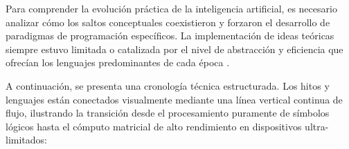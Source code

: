 \documentclass[12pt, a4paper]{article}
\begin{document}
Para comprender la evolución práctica de la inteligencia artificial, es necesario analizar cómo los saltos conceptuales coexistieron y forzaron el desarrollo de paradigmas de programación específicos. La implementación de ideas teóricas siempre estuvo limitada o catalizada por el nivel de abstracción y eficiencia que ofrecían los lenguajes predominantes de cada época \parencite{buchanan2005very}.

A continuación, se presenta una cronología técnica estructurada. Los hitos y lenguajes están conectados visualmente mediante una línea vertical continua de flujo, ilustrando la transición desde el procesamiento puramente de símbolos lógicos hasta el cómputo matricial de alto rendimiento en dispositivos ultra-limitados:

\vspace{0.4cm}
\noindent
\end{document}

